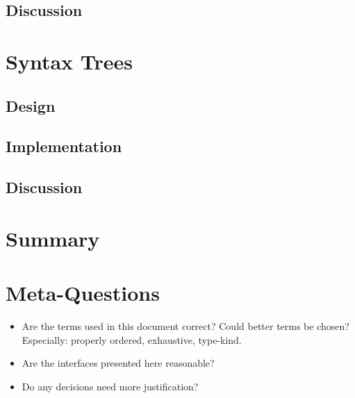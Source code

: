 \documentclass[11pt]{article}
\begin{document}

  \subsection{Discussion}


\section{Syntax Trees}
\label{sec:trees}

  \subsection{Design}

  \subsection{Implementation}

  \subsection{Discussion}

\section{Summary}
\label{sec:summary}


\newpage
\section{Meta-Questions}
\begin{itemize}
  \item Are the terms used in this document correct?  Could better
  terms be chosen?  Especially: properly ordered, exhaustive,
  type-kind.
  \item Are the interfaces presented here reasonable?
  \item Do any decisions need more justification?
\end{itemize}
\end{document}
